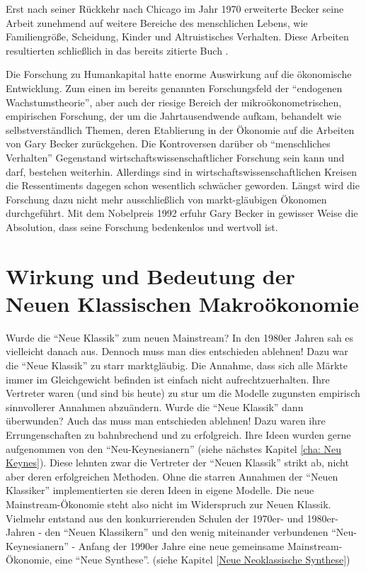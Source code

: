 Erst nach seiner Rückkehr nach Chicago im Jahr 1970 erweiterte Becker seine Arbeit zunehmend auf weitere Bereiche des menschlichen Lebens, wie Familiengröße, Scheidung, Kinder und Altruistisches Verhalten. Diese Arbeiten resultierten schließlich in das bereits zitierte Buch \textcite{Becker1981}.

Die Forschung zu Humankapital hatte enorme Auswirkung auf die ökonomische Entwicklung. Zum einen im bereits genannten Forschungsfeld der "`endogenen Wachstumstheorie"', aber auch der riesige Bereich der mikroökonometrischen, empirischen Forschung, der um die Jahrtausendwende aufkam, behandelt wie selbstverständlich Themen, deren Etablierung in der Ökonomie auf die Arbeiten von Gary Becker zurückgehen.
Die Kontroversen darüber ob "`menschliches Verhalten"' Gegenstand wirtschaftswissenschaftlicher Forschung sein kann und darf, bestehen weiterhin. Allerdings sind in wirtschaftswissenschaftlichen Kreisen die Ressentiments dagegen schon wesentlich schwächer geworden. Längst wird die Forschung dazu nicht mehr ausschließlich von markt-gläubigen Ökonomen durchgeführt. Mit dem Nobelpreis 1992 erfuhr Gary Becker in gewisser Weise die Absolution, dass seine Forschung bedenkenlos und wertvoll ist.





\section{Wirkung und Bedeutung der Neuen Klassischen Makroökonomie}

Wurde die "`Neue Klassik"' zum neuen Mainstream? In den 1980er Jahren sah es vielleicht danach aus. Dennoch muss man dies entschieden ablehnen! Dazu war die "`Neue Klassik"' zu starr marktgläubig. Die Annahme, dass sich alle Märkte immer im Gleichgewicht befinden ist einfach nicht aufrechtzuerhalten. Ihre Vertreter waren (und sind bis heute) zu stur um die Modelle zugunsten empirisch sinnvollerer Annahmen abzuändern.
Wurde die "`Neue Klassik"' dann überwunden? Auch das muss man entschieden ablehnen! Dazu waren ihre Errungenschaften zu bahnbrechend und zu erfolgreich. Ihre Ideen wurden gerne aufgenommen von den "`Neu-Keynesianern"' (siehe nächstes Kapitel \ref{cha: Neu Keynes}). Diese lehnten zwar die Vertreter der "`Neuen Klassik"' strikt ab, nicht aber deren erfolgreichen Methoden. Ohne die starren Annahmen der "`Neuen Klassiker"' implementierten sie deren Ideen in eigene Modelle.
Die neue Mainstream-Ökonomie steht also nicht im Widerspruch zur Neuen Klassik. Vielmehr entstand aus den konkurrierenden Schulen der 1970er- und 1980er-Jahren - den "`Neuen Klassikern"' und den wenig miteinander verbundenen "`Neu-Keynesianern"' - Anfang der 1990er Jahre eine neue gemeinsame Mainstream-Ökonomie, eine "`Neue Synthese"'. (siehe Kapitel \ref{Neue Neoklassische Synthese})

